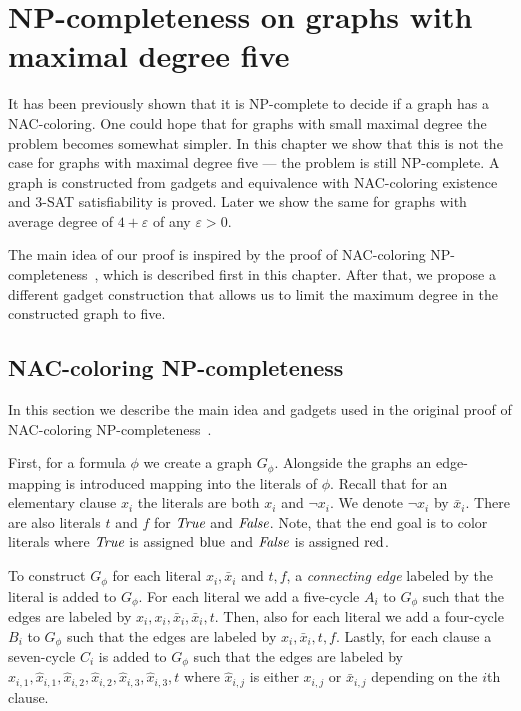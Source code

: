 \chapter{NP-completeness on graphs with maximal degree five}%
\label{chapter:NP}

\begin{chapterabstract}

	It has been previously shown that it is NP-complete to decide
	if a graph has a NAC-coloring.
	One could hope that for graphs with small maximal degree
	the problem becomes somewhat simpler.
	In this chapter we show that this is not the case
	for graphs with maximal degree five --- the problem is still NP-complete.
	A graph is constructed from gadgets and equivalence
	with NAC-coloring existence and 3-SAT satisfiability is proved.
	Later we show the same for graphs with average degree of
	$4+\varepsilon$ of any $\varepsilon > 0$.

\end{chapterabstract}

The main idea of our proof is inspired by
the proof of NAC-coloring NP-completeness~\cite{np_complete},
which is described first in this chapter.
After that, we propose a different gadget construction
that allows us to limit the maximum
degree in the constructed graph to five.

\section{NAC-coloring NP-completeness}

In this section we describe the main idea and gadgets used
in the original proof of NAC-coloring NP-completeness~\cite{np_complete}.

First, for a formula \( \phi \) we create a graph \( G_\phi \).
Alongside the graphs an edge-mapping is introduced mapping into the literals
of \( \phi \). Recall that for an elementary clause \( x_i \) the literals
are both \( x_i \) and \( \neg x_i \). We denote \( \lnot x_i \) by \( \bar{x}_i \).
There are also literals \( t \) and \( f \) for \( \textit{True} \) and \( \textit{False} \).
Note, that the end goal is to color literals where \( \textit{True} \) is assigned \( \text{blue} \)
and \( \textit{False} \) is assigned \( \text{red} \).

To construct \( G_\phi \) for each literal \( x_i, \bar{x}_i\) and \( t, f \),
a \emph{connecting edge} labeled by the literal is added to \( G_\phi \).
For each literal we add a five-cycle \( A_i \) to \( G_\phi \)
such that the edges are labeled by \( x_i, x_i, \bar{x}_i, \bar{x}_i, t \).
Then, also for each literal we add a four-cycle \( B_i \) to \( G_\phi \)
such that the edges are labeled by \( x_i, \bar{x}_i, t, f \).
Lastly, for each clause a seven-cycle \( C_i \) is added to \( G_\phi \)
such that the edges are labeled by
\( \hat{x}_{i,1}, \hat{x}_{i,1}, \hat{x}_{i,2}, \hat{x}_{i,2}, \hat{x}_{i,3}, \hat{x}_{i,3}, t \)
where \( \hat{x}_{i,j} \) is either \( x_{i,j} \) or \( \bar{x}_{i,j} \)
depending on the \( i \)th clause.

